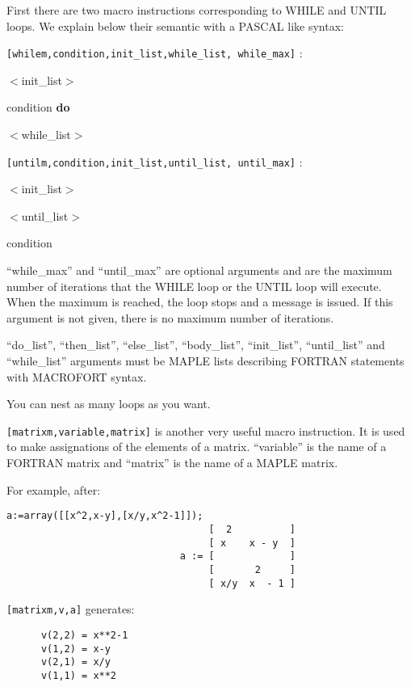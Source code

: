 First there are two macro instructions corresponding to WHILE and UNTIL
loops. We explain below their semantic with a PASCAL like syntax:

\smallskip
{\tt [whilem,{\rm condition},{\rm init\_list},{\rm while\_list},{\rm
while\_max}]} :

\quad $<$init\_list$>$\par
{} condition {\bf do}\par
\qquad  $<$while\_list$>$\par
{}

\smallskip
{\tt [untilm,{\rm condition},{\rm init\_list},{\rm until\_list},{\rm 
until\_max}]} :

\quad $<$init\_list$>$\par
{} $<$until\_list$>$\par
{} condition\par
{}

``while\_max'' and ``until\_max'' are optional arguments and are the maximum 
number of iterations
that the WHILE loop or  the UNTIL loop will execute. When the maximum 
is reached,
the loop stops and a message is issued. If this argument is not given, there
is no maximum number of iterations.

``do\_list'', ``then\_list'', ``else\_list'', 
``body\_list'', 
``init\_list'', ``until\_list'' and ``while\_list'' arguments
must be MAPLE lists describing FORTRAN statements with MACROFORT syntax. 

You can nest as many loops as you want.

{\tt [matrixm,{\rm variable},{\rm matrix}]} is another very useful
macro instruction. It is used to make assignations of the elements
of a matrix. ``variable'' is the name of a FORTRAN matrix and ``matrix''
is the name of a MAPLE matrix.

For example, after:
\begin{verbatim}
a:=array([[x^2,x-y],[x/y,x^2-1]]);
                                   [  2          ]
                                   [ x    x - y  ]
                              a := [             ]
                                   [       2     ]
                                   [ x/y  x  - 1 ]

\end{verbatim}
{\tt [matrixm,v,a]} generates:
\begin{verbatim}
      v(2,2) = x**2-1
      v(1,2) = x-y
      v(2,1) = x/y
      v(1,1) = x**2
\end{verbatim}

